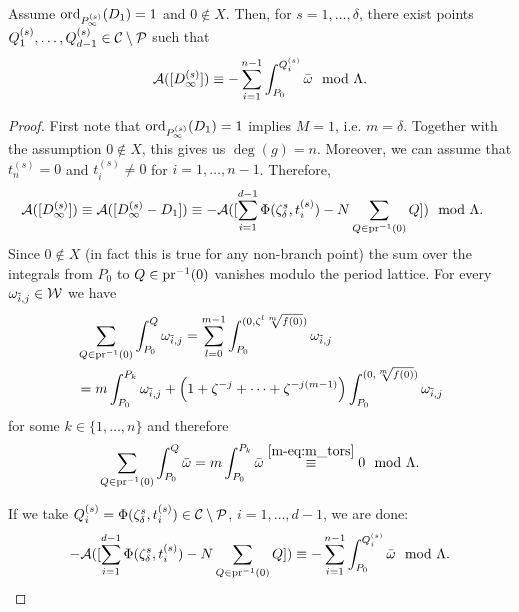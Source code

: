 \documentclass[main.tex]{subfiles}
\begin{document}
  \begin{thm}\label{thm:ajm_inf_ord1}
    Assume $\operatorname{ord}_{P_{\infty}^{(s)}}(D_1) = 1$ and $0 \not\in X$. Then, for $s = 1,\dots,\delta$, there exist points $Q_1^{(s)},\dots,Q_{d-1}^{(s)} \in \mathcal{C} \setminus \mathcal{P}$ such that
    \begin{equation}\label{eq:ajm_inf_ord1}
       \mathcal{A}( [D_{\infty}^{(s)}] ) \equiv -\sum_{i = 1}^{n-1} \int_{P_0}^{Q_i^{(s)}} \bar{\omega} \mod \Lambda.
    \end{equation}
  \end{thm}
  \begin{proof}
    First note that $\operatorname{ord}_{P_{\infty}^{(s)}}(D_1) = 1$ implies $M = 1$, i.e. $m = \delta$. Together with the assumption
    $0 \not\in X$, this gives us $\deg(g) = n$.
    Moreover, we can assume that $t_n^{(s)} = 0$ and $t_i^{(s)} \ne 0$ for $i=1,\dots,n-1$.
    Therefore,
    \begin{align}
      \mathcal{A}( [D_{\infty}^{(s)}] )  & \equiv  \mathcal{A}([D_{\infty}^{(s)} - D_1])  
      \equiv  -\mathcal{A}( [\sum_{i = 1}^{d-1} \Phi(\zeta_{\delta}^s,t_i^{(s)}) - N \sum_{Q \in \operatorname{pr}^{-1}(0)} Q  ] )
       \mod \Lambda.
    \end{align}
    Since  $0 \not\in X$ (in fact this is true for any non-branch point) the sum over the integrals from $P_0$ to $Q \in \operatorname{pr}^{-1}(0)$ vanishes modulo the period lattice. 
    For every $\omega_{\tilde{i},j} \in \mathcal{W}$ we have
    \begin{align}
      & \sum_{Q \in \operatorname{pr}^{-1}(0)} \int_{P_0}^Q \omega_{\tilde{i},j} =  \sum_{l=0}^{m-1} \int_{P_0}^{(0,\zeta^l \sqrt[m]{f(0)})} \omega_{\tilde{i},j} \\
    & = m \int_{P_0}^{P_k} \omega_{\tilde{i},j} + \left(1 + \zeta^{-j} + \dots + \zeta^{-j(m-1)}\right) \int_{P_0}^{(0,\sqrt[m]{f(0)})} \omega_{\tilde{i},j}
    \end{align}
    for some $k \in \{1,\dots,n\}$ and therefore
    \begin{equation}
       \sum_{Q \in \operatorname{pr}^{-1}(0)} \int_{P_0}^Q \bar{\omega} =  m \int_{P_0}^{P_k} \bar{\omega} \overset{\eqref{m-eq:m_tors}}{\equiv} 0 \mod \Lambda.
    \end{equation}
    
    If we take $Q_i^{(s)} = \Phi(\zeta_{\delta}^s,t_i^{(s)}) \in \mathcal{C} \setminus \mathcal{P}$, $i = 1,\dots,d-1$, we are done:
    \begin{align}
    -\mathcal{A}( [\sum_{i = 1}^{d-1} \Phi(\zeta_{\delta}^s,t_i^{(s)}) - N \sum_{Q \in \operatorname{pr}^{-1}(0)} Q ] ) \equiv 
    -\sum_{i = 1}^{n-1} \int_{P_0}^{Q_i^{(s)}} \bar{\omega} \mod \Lambda.
    \end{align}
     \end{proof}
    
\end{document}
